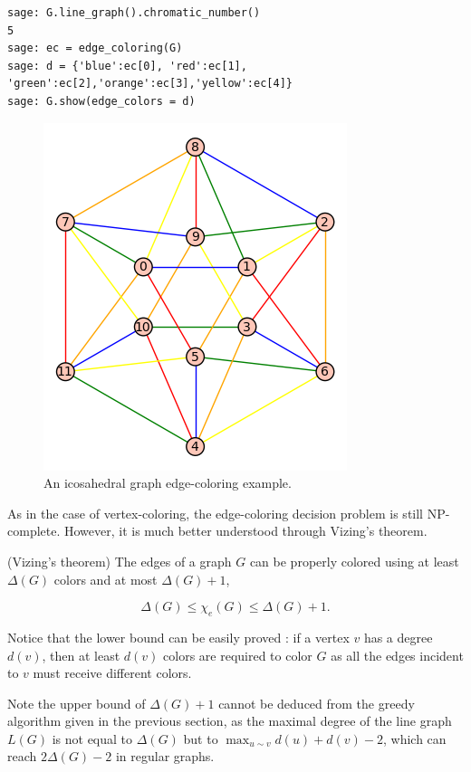 \begin{lstlisting}
sage: G.line_graph().chromatic_number()
5
sage: ec = edge_coloring(G)
sage: d = {'blue':ec[0], 'red':ec[1], 'green':ec[2],'orange':ec[3],'yellow':ec[4]}
sage: G.show(edge_colors = d)
\end{lstlisting}

\begin{figure}[!htbp]
\centering
{}
\includegraphics[scale=0.7]{image/graph-coloring/icosahedral-graph-edge-coloring-example}
\caption{An icosahedral graph edge-coloring example.}
\label{fig:graph_coloring:icosahedral_graph_edge_coloring_example}
\end{figure}

As in the case of vertex-coloring, the edge-coloring decision problem is
still NP-complete. However, it is much better understood through
Vizing's theorem.

\begin{theorem}
(Vizing's theorem)
The edges of a graph $G$ can be properly colored using at least
$\Delta(G)$ colors and at most $\Delta(G)+1$,

\[
\Delta(G)\leq \chi_e(G)\leq \Delta(G)+1.
\]
\end{theorem}

Notice that the lower bound can be easily proved : if a vertex
$v$ has a degree $d(v)$, then at least $d(v)$ colors are required
to color $G$ as all the edges incident to $v$ must receive
different colors.

Note the upper bound of $\Delta(G)+1$
cannot be deduced from the greedy algorithm given in the
previous section, as the maximal degree of the line graph
$L(G)$ is not equal to
$\Delta(G)$ but to $\displaystyle \max_{u\sim v}d(u)+d(v)-2$, which
can reach $2\Delta(G)-2$ in regular graphs.


